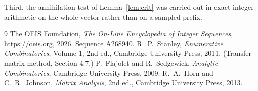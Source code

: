 \documentclass[11pt,a4paper]{article}
\theoremstyle{plain}
\theoremstyle{definition}
\begin{document}
Third, the annihilation test of Lemma~\ref{lem:crit} was carried out in exact integer
arithmetic on the whole vector rather than on a sampled prefix.

\begin{thebibliography}{9}
 The OEIS Foundation, \emph{The On-Line Encyclopedia of Integer
Sequences}, \url{https://oeis.org}, 2026. Sequence A268940.
 R.~P.~Stanley, \emph{Enumerative Combinatorics}, Volume 1, 2nd ed.,
Cambridge University Press, 2011. (Transfer-matrix method, Section 4.7.)
 P.~Flajolet and R.~Sedgewick, \emph{Analytic Combinatorics}, Cambridge
University Press, 2009.
 R.~A.~Horn and C.~R.~Johnson, \emph{Matrix Analysis}, 2nd ed., Cambridge
University Press, 2013.
\end{thebibliography}
\end{document}
